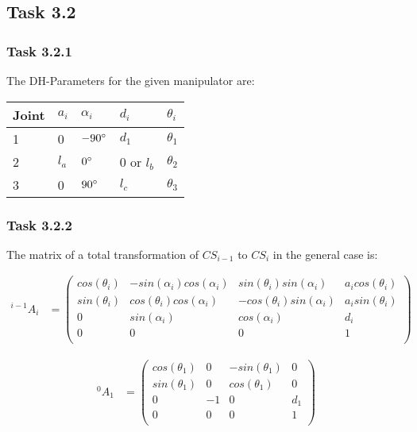 \subsection*{Task 3.2}

\subsubsection*{Task 3.2.1}
The DH-Parameters for the given manipulator are:
\begin{center}
	\begin{tabular}{ | l | l | l | l | l |}
		\hline
		Joint & $a_{i}$ & $\alpha_{i}$ & $d_i$ & $\theta_i$ \\ \hline
		1 & 0 & $-90\degree$ & $d_1$ & $\theta_1$\\ \hline
		2 & $l_a$ & $0\degree$ & 0 or $l_b$ & $\theta_2$\\ \hline
		3 & 0 & $90\degree$ & $l_c$ & $\theta_3$\\ \hline
	\end{tabular}
\end{center}

\subsubsection*{Task 3.2.2}
The matrix of a total transformation of $CS_{i-1}$ to $CS_i$ in the general case is:

\begin{align*}
^{i-1}A_i &= 
\begin{pmatrix}
cos(\theta_i) & -sin(\alpha_i)cos(\alpha_i) & sin(\theta_i)sin(\alpha_i) & a_icos(\theta_i) \\
sin(\theta_i) & cos(\theta_i)cos(\alpha_i) & -cos(\theta_i)sin(\alpha_i) & a_isin(\theta_i) \\
0 & sin(\alpha_i) & cos(\alpha_i) & d_i \\
0 & 0 & 0 & 1 \\
\end{pmatrix}
\end{align*}

\begin{align*}
^{0}A_1 &= 
\begin{pmatrix}
cos(\theta_1) & 0 & -sin(\theta_1) & 0 \\
sin(\theta_1) & 0 & cos(\theta_1) & 0 \\
0 & -1 & 0 & d_1 \\
0 & 0 & 0 & 1 \\
\end{pmatrix}
\end{align*}

